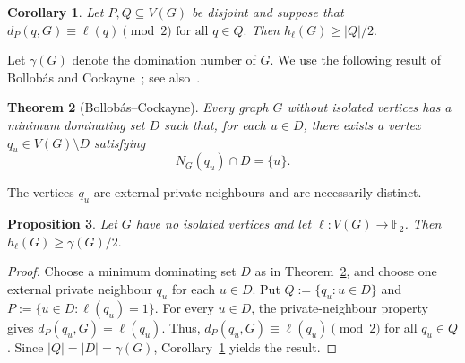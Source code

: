 \documentclass[11pt]{article}
\newtheorem{theorem}{Theorem}
\newtheorem{proposition}[theorem]{Proposition}
\newtheorem{corollary}[theorem]{Corollary}
\theoremstyle{definition}
\theoremstyle{remark}
\newtheorem{remark}[theorem]{Remark}
\newcommand{\F}{\mathbb{F}}
\newcommand{\1}{\mathbf{1}}
\begin{document}
	\begin{corollary}\label{cor:one-sided}
		Let $P,Q\subseteq V(G)$ be disjoint and suppose that
		$
		d_P(q,G)\equiv \ell(q)\pmod 2
		\mbox{ for all } q\in Q.
		$
		Then
		$
		h_\ell(G)\ge |Q|/2.
		$
	\end{corollary}
	
	
	Let $\gamma(G)$ denote the domination number of $G$.  We use the following
	result of Bollob\'as and Cockayne~\cite{BC}; see also~\cite{Haynes}.
	
	\begin{theorem}[Bollob\'as--Cockayne]\label{thm:BC}
		Every graph $G$ without isolated vertices has a minimum dominating set
		$D$ such that, for each $u\in D$, there exists a vertex
		$q_u\in V(G)\setminus D$ satisfying
		\[
		N_G(q_u)\cap D=\{u\}.
		\]
	\end{theorem}
	
	The vertices $q_u$ are external private neighbours and are necessarily
	distinct.
	
	\begin{proposition}\label{prop:gamma}
		Let $G$ have no isolated vertices and let $\ell:V(G)\to\F_2$.  Then
		$ h_\ell(G)\ge \gamma(G)/2.$
	\end{proposition}
	\begin{proof}
		Choose a minimum dominating set $D$ as in Theorem~\ref{thm:BC}, and choose
		one external private neighbour $q_u$ for each $u\in D$.  Put
		$
		Q:=\{q_u:u\in D\}
		$
		and
		$
		P:=\{u\in D:\ell(q_u)=1\}.
		$
		For every $u\in D$, the private-neighbour property gives
		$d_P(q_u,G)=\ell(q_u).$ Thus, $d_P(q_u,G)\equiv\ell(q_u)\pmod2$ for all $q_u\in Q$.  Since
		$|Q|=|D|=\gamma(G)$, Corollary~\ref{cor:one-sided} yields the result.
	\end{proof}
	
\end{document}
